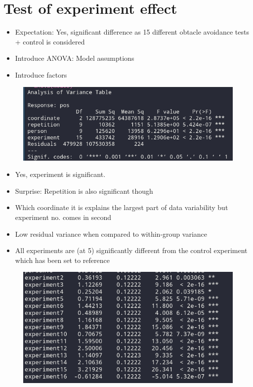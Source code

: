 \documentclass[12pt,fleqn]{article}
\begin{document}
\section{Test of experiment effect}
\begin{itemize}
	\item Expectation: Yes, significant difference as 15 different obtacle avoidance tests + control is considered
\end{itemize}
\begin{itemize}
	\item Introduce ANOVA: Model assumptions
	\item Introduce factors
\end{itemize}
\begin{figure}[H]
	\centering
	\includegraphics[width=.7\linewidth]{p1_anova}
\end{figure}
\begin{itemize}
	\item Yes, experiment is significant. 
	\item Surprise: Repetition is also significant though
	\item Which coordinate it is explains the largest part of data variability but experiment no. comes in second
	\item Low residual variance when compared to within-group variance
	\item All experiments are (at 5\pro) significantly different from the control experiment which has been set to reference
\end{itemize}
\begin{figure}[H]
	\centering
	\includegraphics[width=.7\linewidth]{p1_anova_summay}
\end{figure}
\end{document}
